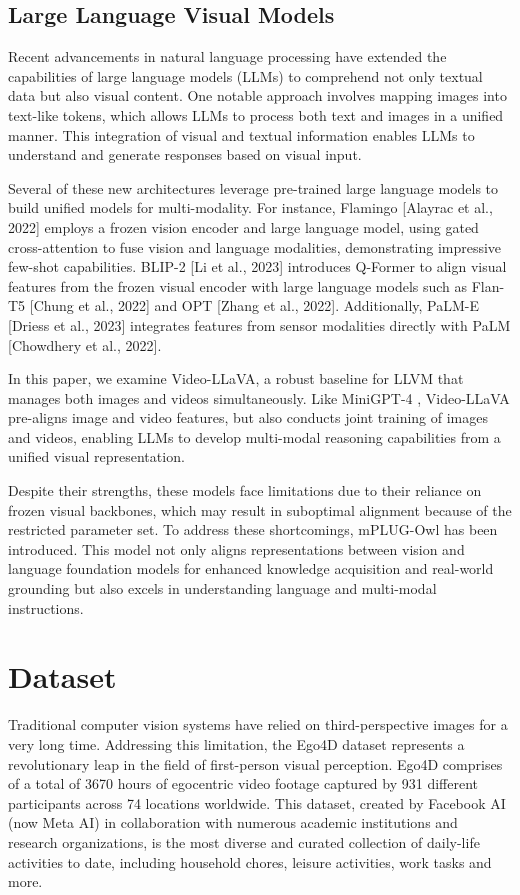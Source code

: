 \documentclass[conference]{IEEEtran}
\begin{document}
\subsection{Large Language Visual Models}
Recent advancements in natural language processing have extended the capabilities of large language models (LLMs) to comprehend not only textual data but also visual content. One notable approach involves mapping images into text-like tokens, which allows LLMs to process both text and images in a unified manner. This integration of visual and textual information enables LLMs to understand and generate responses based on visual input.

Several of these new architectures leverage pre-trained large language models to build unified models for multi-modality. For instance, Flamingo [Alayrac et al., 2022] employs a frozen vision encoder and large language model, using gated cross-attention to fuse vision and language modalities, demonstrating impressive few-shot capabilities. BLIP-2 [Li et al., 2023] introduces Q-Former to align visual features from the frozen visual encoder with large language models such as Flan-T5 [Chung et al., 2022] and OPT [Zhang et al., 2022]. Additionally, PaLM-E [Driess et al., 2023] integrates features from sensor modalities directly with PaLM [Chowdhery et al., 2022].

In this paper, we examine Video-LLaVA, a robust baseline for LLVM that manages both images and videos simultaneously. Like MiniGPT-4 \cite{b6}, Video-LLaVA pre-aligns image and video features, but also conducts joint training of images and videos, enabling LLMs to develop multi-modal reasoning capabilities from a unified visual representation.

Despite their strengths, these models face limitations due to their reliance on frozen visual backbones, which may result in suboptimal alignment because of the restricted parameter set. To address these shortcomings, mPLUG-Owl \cite{b7} has been introduced. This model not only aligns representations between vision and language foundation models for enhanced knowledge acquisition and real-world grounding but also excels in understanding language and multi-modal instructions.


\section{Dataset}
Traditional computer vision systems have relied on third-perspective images for a very long time. Addressing this limitation, the Ego4D dataset represents a revolutionary leap in the field of first-person visual perception. Ego4D comprises of a total of 3670 hours of egocentric video footage captured by 931 different participants across 74 locations worldwide. This dataset, created by Facebook AI (now Meta AI) in collaboration with numerous academic institutions and research organizations, is the most diverse and curated collection of daily-life activities to date, including household chores, leisure activities, work tasks and more. 
\end{document}
